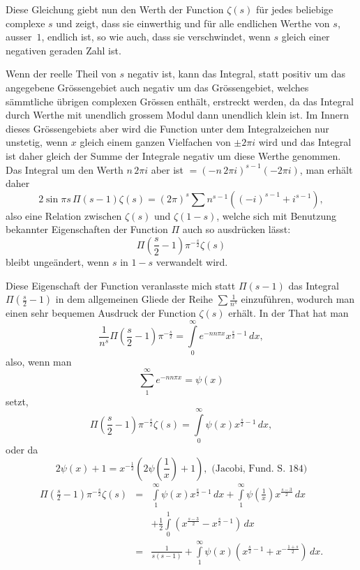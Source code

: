 \documentclass[a4paper,12pt]{article}
\begin{document}
Diese Gleichung giebt nun den Werth der Function $\zeta(s)$ f\"{u}r
jedes beliebige complexe $s$ und zeigt, dass sie einwerthig und
f\"{u}r alle endlichen Werthe von $s$, ausser~$1$, endlich ist, so wie
auch, dass sie verschwindet, wenn $s$ gleich einer negativen geraden
Zahl ist.

Wenn der reelle Theil von $s$ negativ ist, kann das Integral, statt
positiv um das angegebene Gr\"{o}ssengebiet auch negativ um das
Gr\"{o}ssengebiet, welches s\"{a}mmtliche \"{u}brigen complexen
Gr\"{o}ssen enth\"{a}lt, erstreckt werden, da das Integral durch
Werthe mit unendlich grossem Modul dann unendlich klein ist.  Im Innern
dieses Gr\"{o}ssengebiets aber wird die Function unter dem
Integralzeichen nur unstetig, wenn $x$ gleich einem ganzen Vielfachen
von $\pm 2\pi i$ wird und das Integral ist daher gleich der Summe der
Integrale negativ um diese Werthe genommen.  Das Integral um den Werth
$n \, 2\pi i$ aber ist $= (-n \, 2\pi i)^{s-1}(-2\pi i)$, man
erh\"{a}lt daher
\[ 2 \sin \pi s \, \Pi(s - 1) \zeta(s)
   = (2\pi)^s {\textstyle\sum} n^{s-1} ((-i)^{s-1} + i^{s-1}),\]
also eine Relation zwischen $\zeta(s)$ und $\zeta(1 - s)$, welche sich
mit Benutzung bekannter Eigenschaften der Function $\Pi$ auch so
ausdr\"{u}cken l\"{a}sst:
\[ \Pi \left( \frac{s}{2} - 1 \right) \pi^{-\frac{s}{2}} \zeta(s) \]
bleibt unge\"{a}ndert, wenn $s$ in $1 - s$ verwandelt wird.

Diese Eigenschaft der Function veranlasste mich statt $\Pi(s - 1)$ das
Integral $\displaystyle \Pi \left( \frac{s}{2} - 1 \right)$ in dem
allgemeinen Gliede der Reihe $\displaystyle \sum \frac{1}{n^s}$
einzuf\"{u}hren, wodurch man einen sehr bequemen Ausdruck der Function
$\zeta(s)$ erh\"{a}lt.  In der That hat man
\[ \frac{1}{n^s} \Pi \left( \frac{s}{2} - 1 \right) \pi^{-\frac{s}{2}}
   = \int\limits_0^\infty e^{-nn\pi x} x^{\frac{s}{2} - 1} \,dx,\]
also, wenn man
\[ \sum_1^\infty e^{-nn\pi x} = \psi(x) \]
setzt,
\[ \Pi \left( \frac{s}{2} - 1 \right) \pi^{-\frac{s}{2}} \zeta(s)
   = \int\limits_0^\infty \psi(x) x^{\frac{s}{2} - 1} \,dx,\]
oder da
\[ 2 \psi(x) + 1 = x^{-\frac{1}{2}} \left(
         2\psi \left( \frac{1}{x} \right) + 1 \right),
   \mbox{ (Jacobi, Fund. S. 184)}\]
\begin{eqnarray*}
\Pi \left( \frac{s}{2} - 1 \right) \pi^{-\frac{s}{2}} \zeta(s)
   &=& \int\limits_1^\infty \psi(x) x^{\frac{s}{2} - 1} \,dx
      + \int\limits_1^\infty \psi \left( \frac{1}{x} \right)
            x^{\frac{s-3}{2}} \,dx \\
   & &+ {\textstyle\frac{1}{2}} \int\limits_0^1 \left(
            x^{\frac{s-3}{2}} - x^{\frac{s}{2} - 1}
            \right) \,dx \\
   &=& \frac{1}{s(s-1)} + \int\limits_1^\infty \psi(x) \left(
            x^{\frac{s}{2} - 1} + x^{-\frac{1+s}{2}}
            \right) \,dx.
\end{eqnarray*}
\end{document}
